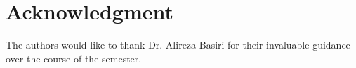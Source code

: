 \documentclass[journal,onecolumn]{IEEEtran}
\begin{document}
\clearpage
\section*{Acknowledgment}

The authors would like to thank Dr. Alireza Basiri for their invaluable guidance over the course of the semester.


\ifCLASSOPTIONcaptionsoff
  \newpage
\fi






%
%

\end{document}
